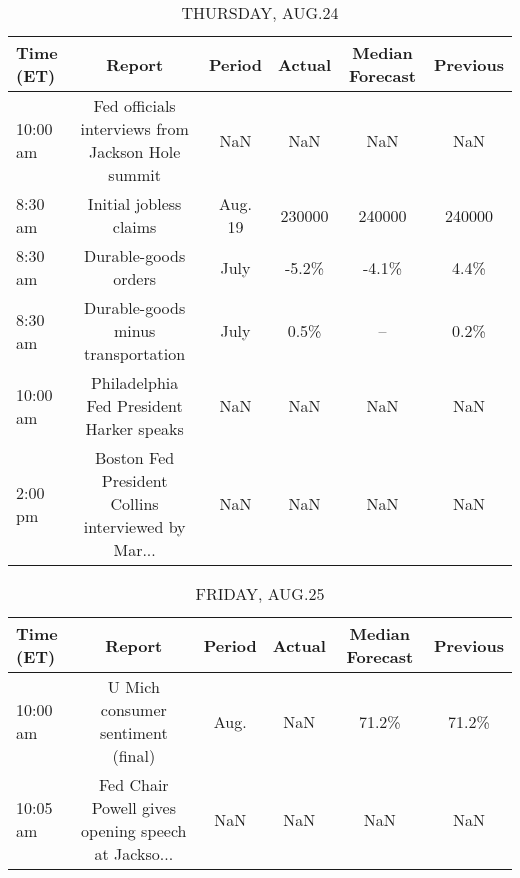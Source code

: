 \documentclass{article}%
\begin{document}
%


\begin{table}[htbp]%
\caption{THURSDAY, AUG.24}%
\centering%
\begin{adjustbox}{width=1\textwidth}%
\begin{tabular}{lccccc}
\toprule
Time (ET) &                                             Report &  Period & Actual & Median Forecast & Previous \\
\midrule
 10:00 am &  Fed officials interviews from Jackson Hole summit &     NaN &    NaN &             NaN &      NaN \\
  8:30 am &                             Initial jobless claims & Aug. 19 & 230000 &          240000 &   240000 \\
  8:30 am &                               Durable-goods orders &    July &  -5.2\% &           -4.1\% &     4.4\% \\
  8:30 am &                 Durable-goods minus transportation &    July &   0.5\% &              -- &     0.2\% \\
 10:00 am &           Philadelphia Fed President Harker speaks &     NaN &    NaN &             NaN &      NaN \\
  2:00 pm & Boston Fed President Collins interviewed by Mar... &     NaN &    NaN &             NaN &      NaN \\
\bottomrule
\end{tabular}
%
\end{adjustbox}%
\end{table}

%


\begin{table}[htbp]%
\caption{FRIDAY, AUG.25}%
\centering%
\begin{adjustbox}{width=1\textwidth}%
\begin{tabular}{lccccc}
\toprule
Time (ET) &                                             Report & Period & Actual & Median Forecast & Previous \\
\midrule
 10:00 am &                  U Mich consumer sentiment (final) &   Aug. &    NaN &           71.2\% &    71.2\% \\
 10:05 am & Fed Chair Powell gives opening speech at Jackso... &    NaN &    NaN &             NaN &      NaN \\
\bottomrule
\end{tabular}
%
\end{adjustbox}%
\end{table}
\end{document}
